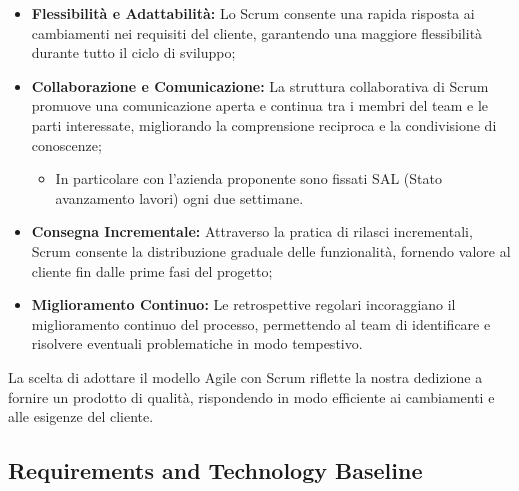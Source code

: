 \documentclass{article}
\begin{document}
\begin{itemize}
    \item \textbf{Flessibilità e Adattabilità:} Lo Scrum consente una rapida risposta ai cambiamenti nei requisiti del cliente, garantendo una maggiore flessibilità durante tutto il ciclo di sviluppo;
    \item \textbf{Collaborazione e Comunicazione:} La struttura collaborativa di Scrum promuove una comunicazione aperta e continua tra i membri del team e le parti interessate, migliorando la comprensione reciproca e la condivisione di conoscenze;
    \begin{itemize}
        \item In particolare con l'azienda proponente sono fissati SAL (Stato avanzamento lavori) ogni due settimane.
    \end{itemize}
    \item \textbf{Consegna Incrementale:} Attraverso la pratica di rilasci incrementali, Scrum consente la distribuzione graduale delle funzionalità, fornendo valore al cliente fin dalle prime fasi del progetto;
    \item \textbf{Miglioramento Continuo:} Le retrospettive regolari incoraggiano il miglioramento continuo del processo, permettendo al team di identificare e risolvere eventuali problematiche in modo tempestivo.
\end{itemize}

La scelta di adottare il modello Agile con Scrum riflette la nostra dedizione a fornire un prodotto di qualità, rispondendo in modo efficiente ai cambiamenti e alle esigenze del cliente.

\subsection{Requirements and Technology Baseline}
\end{document}
